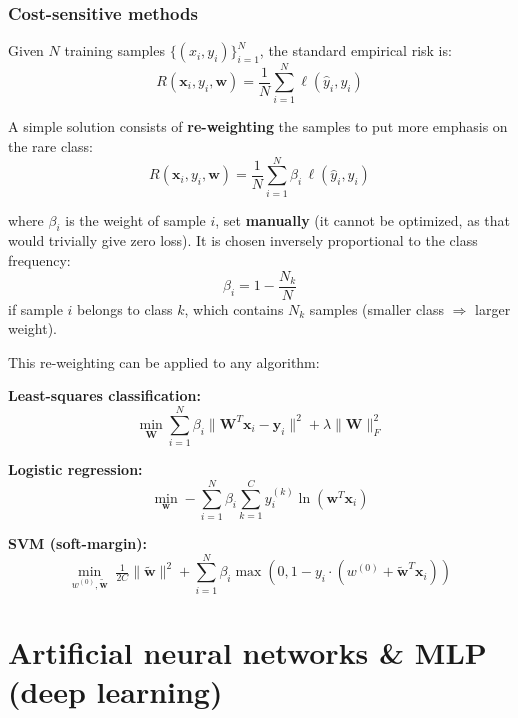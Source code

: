 \documentclass[11pt,a4paper,openany]{book}
\begin{document}
\subsubsection{Cost-sensitive methods}

Given $N$ training samples $\{(x_i, y_i)\}_{i=1}^N$, the standard empirical risk is:
\[
R({\mathbf{x}_i}, {y_i}, \mathbf{w}) = \frac{1}{N} \sum_{i=1}^{N} \ell(\hat{y}_i, y_i)
\]

A simple solution consists of \textbf{re-weighting} the samples to put more emphasis on the rare class:
\[
R({\mathbf{x}_i}, {y_i}, \mathbf{w}) = \frac{1}{N} \sum_{i=1}^{N} \beta_i \, \ell(\hat{y}_i, y_i)
\]

where $\beta_i$ is the weight of sample $i$, set \textbf{manually} (it cannot be optimized, as that would trivially give zero loss). It is chosen inversely proportional to the class frequency:
\[
\beta_i = 1 - \frac{N_k}{N}
\]
if sample $i$ belongs to class $k$, which contains $N_k$ samples (smaller class $\Rightarrow$ larger weight).

This re-weighting can be applied to any algorithm:

\begin{defnbox}[title=Weighted empirical risk — applications]
\textbf{Least-squares classification:}
\[
\min_{\mathbf{W}} \sum_{i=1}^{N} \beta_i \|\mathbf{W}^T \mathbf{x}_i - \mathbf{y}_i\|^2 + \lambda\|\mathbf{W}\|_F^2
\]

\textbf{Logistic regression:}
\[
\min_{\mathbf{w}} -\sum_{i=1}^{N} \beta_i \sum_{k=1}^{C} y_i^{(k)} \ln(\mathbf{w}^T \mathbf{x}_i)
\]

\textbf{SVM (soft-margin):}
\[
\min_{w^{(0)},\mathbf{\tilde{w}}} \;\tfrac{1}{2C}\|\mathbf{\tilde{w}}\|^2 + \sum_{i=1}^{N} \beta_i \max(0, 1 - y_i \cdot (w^{(0)} + \mathbf{\tilde{w}}^T \mathbf{x}_i))
\]
\end{defnbox}

\newpage \section{Artificial neural networks \& MLP (deep learning)}
\end{document}
